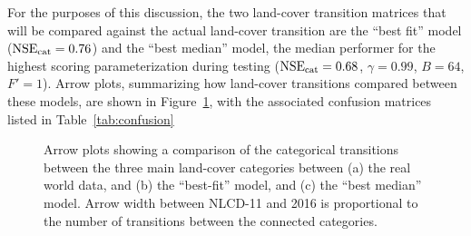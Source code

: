 For the purposes of this discussion,
the two land-cover transition matrices that will be compared against the actual
land-cover transition are the ``best fit'' model ($\text{NSE}_{\text{cat}}=0.76$)
and the ``best median'' model, the median performer for the 
highest scoring parameterization during testing ($\text{NSE}_{\text{cat}}=0.68$, $\gamma=0.99$, $B=64$, $F'=1$).
Arrow plots, summarizing how land-cover transitions compared between these models,
are shown in Figure~\ref{fig:arrows},
with the associated confusion matrices listed in Table~\ref{tab:confusion}

\begin{figure}
\centering
{}
\hfill
{}
\hfill
{}
\caption{Arrow plots showing a comparison of the categorical transitions between
the three main land-cover categories between
(a) the real world data, and (b) the ``best-fit'' model, and (c) the ``best median'' model.
Arrow width between NLCD-11 and 2016 is proportional to the number of transitions between the
connected categories.}
\label{fig:arrows}
\end{figure}

